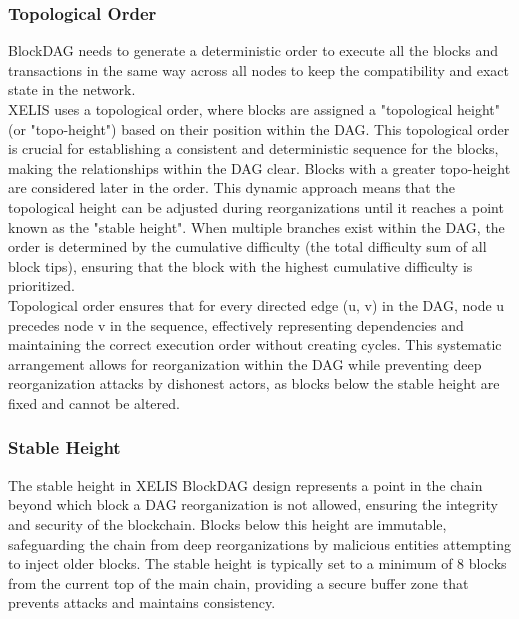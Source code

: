 \documentclass[10pt,a4paper,twocolumn]{article}
\begin{document}
\subsubsection{Topological Order}

BlockDAG needs to generate a deterministic order to execute all the blocks and transactions in the same way across all nodes to keep the compatibility and exact state in the network. \\

XELIS uses a topological order, where blocks are assigned a "topological height" (or "topo-height") based on their position within the DAG. This topological order is crucial for establishing a consistent and deterministic sequence for the blocks, making the relationships within the DAG clear. Blocks with a greater topo-height are considered later in the order. This dynamic approach means that the topological height can be adjusted during reorganizations until it reaches a point known as the "stable height". When multiple branches exist within the DAG, the order is determined by the cumulative difficulty (the total difficulty sum of all block tips), ensuring that the block with the highest cumulative difficulty is prioritized.\\

Topological order ensures that for every directed edge (u, v) in the DAG, node u precedes node v in the sequence, effectively representing dependencies and maintaining the correct execution order without creating cycles. This systematic arrangement allows for reorganization within the DAG while preventing deep reorganization attacks by dishonest actors, as blocks below the stable height are fixed and cannot be altered.\\

\subsubsection{Stable Height}

The stable height in XELIS BlockDAG design represents a point in the chain beyond which block a DAG reorganization is not allowed, ensuring the integrity and security of the blockchain. Blocks below this height are immutable, safeguarding the chain from deep reorganizations by malicious entities attempting to inject older blocks. The stable height is typically set to a minimum of 8 blocks from the current top of the main chain, providing a secure buffer zone that prevents attacks and maintains consistency.
\end{document}
